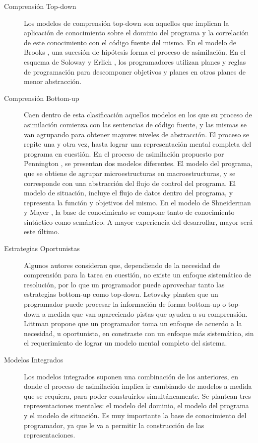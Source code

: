 \begin{description}
    \item[Comprensión Top-down] Los modelos de comprensión top-down son aquellos que 
    implican la aplicación de conocimiento sobre el dominio del programa y la correlación 
    de este conocimiento con el código fuente del mismo.
    En el modelo de Brooks \cite{Brooks93}, una sucesión de hipótesis forma el proceso de asimilación.
    En el esquema de Soloway y Erlich \cite{SolowayErlich84}, los programadores utilizan planes y reglas de programación
    para descomponer objetivos y planes en otros planes de menor abstracción.
     
    \item[Comprensión Bottom-up] Caen dentro de esta clasificación aquellos modelos en
    los que su proceso de asimilación comienza con las sentencias de código fuente, y
    las mismas se van agrupando para obtener mayores niveles de abstracción.
    El proceso se repite una y otra vez, hasta lograr una representación mental completa
    del programa en cuestión.
    En el proceso de asimilación propuesto por Pennington \cite{Pennington87,Pennington87b}, 
    se presentan dos modelos diferentes.
    El modelo del programa, que se obtiene de agrupar microestructuras en macroestructuras, y
    se corresponde con una abstracción del flujo de control del programa.
    El modelo de situación, incluye el flujo de datos dentro del programa, y representa la
    función y objetivos del mismo.
    En el modelo de Shneiderman y Mayer \cite{ShneidermanMayer79}, la base de conocimiento se compone tanto de
    conocimiento sintáctico como semántico.
    A mayor experiencia del desarrollar, mayor será este último.

    \item[Estrategias Oportunistas] Algunos autores consideran que, dependiendo
    de la necesidad de comprensión para la tarea en cuestión, no existe un enfoque
    sistemático de resolución, por lo que un programador puede aprovechar tanto
    las estrategias bottom-up como top-down.
    Letovsky \cite{Letovsky87} plantea que un programador puede procesar la información 
    de forma bottom-up o top-down a medida que van apareciendo pistas que ayuden a su comprensión.
    Littman \cite{LittmanPinto87} propone que un programador toma un enfoque de acuerdo
    a la necesidad, u oportunista, en constraste con un enfoque más sistemático,
    sin el requerimiento de lograr un modelo mental completo del sistema.
    
    \item[Modelos Integrados] Los modelos integrados \cite{MayrhauserVans95} suponen 
    una combinación de los anteriores, en donde el proceso de asimilación implica ir cambiando 
    de modelos a medida que se requiera, para poder construirlos simultáneamente.
    Se plantean tres representaciones mentales: el modelo del dominio, el modelo del
    programa y el modelo de situación.
    Es muy importante la base de conocimiento del programador, ya que le va a permitir
    la construcción de las representaciones.

\end{description}
